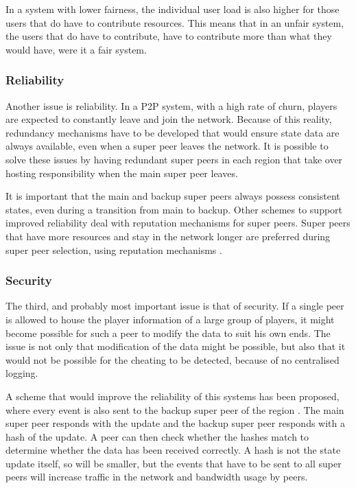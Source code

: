 \documentclass[10pt,a4paper,journal,cspaper,compsoc]{IEEEtran}
\begin{document}
In a system with lower fairness, the individual user load is also higher for those users that do have to contribute resources. This means that in an
unfair system, the users that do have to contribute, have to contribute more than what they would have, were it a fair system.

\subsubsection{Reliability}
\label{super_peer_storage_reliability}

Another issue is reliability. In a P2P system, with a high rate of churn, players are expected to constantly leave and join the network. Because of
this reality, redundancy mechanisms have to be developed that would ensure state data are always available, even when a super peer leaves the
network. It is possible to solve these issues by having redundant super peers in each region that take over hosting responsibility when the main
super peer leaves.

It is important that the main and backup super peers always possess consistent states, even during a transition from main to backup. Other schemes to
support improved reliability deal with reputation mechanisms for super peers. Super peers that have more resources and stay in the network longer are
preferred during super peer selection, using reputation mechanisms \cite{fan_mediator_paper}.

\subsubsection{Security}
The third, and probably most important issue is that of security. If a single peer is allowed to house the player information of a large group of
players, it might become possible for such a peer to modify the data to suit his own ends. The issue is not only that modification of the data might
be possible, but also that it would not be possible for the cheating to be detected, because of no centralised logging.

A scheme that would improve the reliability of this systems has been proposed, where every event is also sent to the backup super peer of the region
\cite{past_storage_focus}. The main super peer responds with the update and the backup super peer responds with a hash of the update. A peer can then
check whether the hashes match to determine whether the data has been received correctly. A hash is not the state update itself, so will be smaller,
but the events that have to be sent to all super peers will increase traffic in the network and bandwidth usage by peers.
\end{document}

